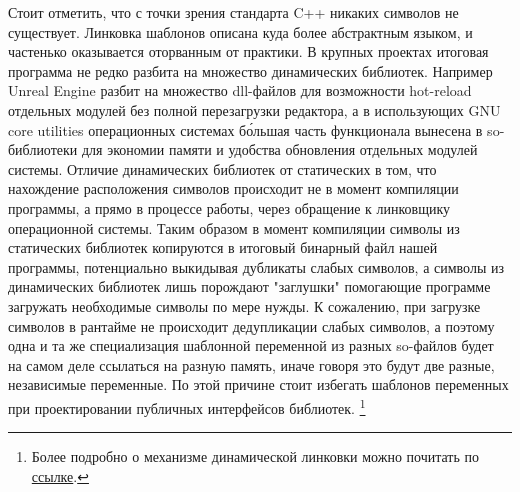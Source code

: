 Стоит отметить, что с точки зрения стандарта C++ никаких символов не существует.
Линковка шаблонов описана куда более абстрактным языком, и частенько оказывается оторванным от практики.
В крупных проектах итоговая программа не редко разбита на множество динамических библиотек.
Например Unreal Engine разбит на множество dll-файлов для возможности hot-reload отдельных модулей без полной перезагрузки редактора, а в использующих GNU core utilities операционных системах б\'{о}льшая часть функционала вынесена в so-библиотеки для экономии памяти и удобства обновления отдельных модулей системы.
Отличие динамических библиотек от статических в том, что нахождение расположения символов происходит не в момент компиляции программы, а прямо в процессе работы, через обращение к линковщику операционной системы.
Таким образом в момент компиляции символы из статических библиотек копируются в итоговый бинарный файл нашей программы, потенциально выкидывая дубликаты слабых символов, а символы из динамических библиотек лишь порождают "заглушки" помогающие программе загружать необходимые символы по мере нужды.
К сожалению, при загрузке символов в рантайме не происходит дедупликации слабых символов, а поэтому одна и та же специализация шаблонной переменной из разных so-файлов будет на самом деле ссылаться на разную память, иначе говоря это будут две разные, независимые переменные.
По этой причине стоит избегать шаблонов переменных при проектировании публичных интерфейсов библиотек.
\footnote{Более подробно о механизме динамической линковки можно почитать по \href{https://www.technovelty.org/linux/plt-and-got-the-key-to-code-sharing-and-dynamic-libraries.html}{ссылке}.}


